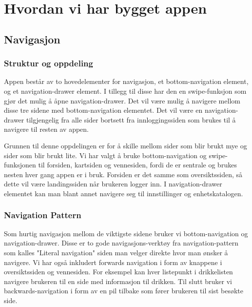 \section{Hvordan vi har bygget appen}
\subsection{Navigasjon}
\subsubsection{Struktur og oppdeling}
Appen består av to hovedelementer for navigasjon, et bottom-navigation element, og et navigation-drawer element. I tillegg til disse har den en swipe-funksjon som gjør det mulig å åpne navigation-drawer. Det vil være mulig å navigere mellom disse tre sidene med bottom-navigation elementet. Det vil være en navigation-drawer tilgjengelig fra alle sider bortsett fra innloggingssiden som brukes til å navigere til resten av appen.

Grunnen til denne oppdelingen er for å skille mellom sider som blir brukt mye og sider som blir brukt lite. Vi har valgt å bruke bottom-navigation og swipe-funksjonen til forsiden, kartsiden og vennesiden, fordi de er sentrale og brukes nesten hver gang appen er i bruk. Forsiden er det samme som oversiktssiden, så dette vil være landingssiden når brukeren logger inn. I navigation-drawer elementet kan man blant annet navigere seg til innstillinger og enhetskatalogen.

\subsubsection{Navigation Pattern}
Som hurtig navigasjon mellom de viktigste sidene bruker vi bottom-navigation og navigation-drawer. Disse er to gode navigasjons-verktøy fra navigation-pattern som kalles "Literal navigation" siden man velger direkte hvor man ønsker å navigere. Vi har også inkludert forwards navigation i form av knappene i oversiktssiden og vennesiden. For eksempel kan hver listepunkt i drikkelisten navigere brukeren til en side med informasjon til drikken. Til slutt bruker vi backwards-navigation i form av en pil tilbake som fører brukeren til sist besøkte side.

